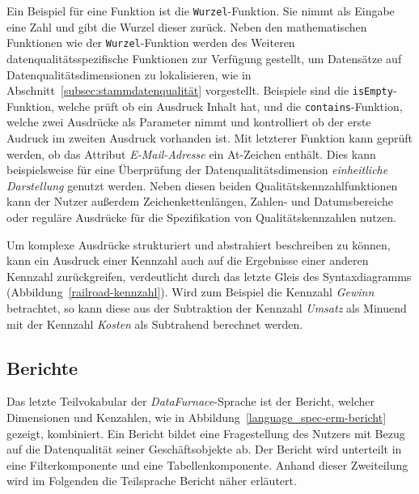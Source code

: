 \documentclass[
  language=german, %
  type=bachelor,%
  ngerman
]{isthesis}
\begin{document}
\begin{content}
	Ein Beispiel für eine Funktion ist die \texttt{Wurzel}-Funktion.  Sie nimmt
	als Eingabe eine Zahl und gibt die Wurzel dieser zurück. Neben den
	mathematischen Funktionen wie der \texttt{Wurzel}-Funktion werden des
	Weiteren datenqualitätsspezifische Funktionen zur Verfügung gestellt, um
	Datensätze auf Datenqualitätsdimensionen zu lokalisieren, wie in
	Abschnitt~\ref{subsec:stammdatenqualität} vorgestellt.  Beispiele sind die
	\texttt{isEmpty}-Funktion, welche prüft ob ein Ausdruck Inhalt hat, und die
	\texttt{contains}-Funktion, welche zwei Ausdrücke als Parameter nimmt und
	kontrolliert ob der erste Audruck im zweiten Ausdruck vorhanden ist. Mit
	letzterer Funktion kann \zB{} geprüft werden, ob das Attribut
	\textit{E-Mail-Adresse} ein At-Zeichen enthält. Dies kann beispielsweise für
	eine Überprüfung der Datenqualitätsdimension \textit{einheitliche
	Darstellung} genutzt werden. Neben diesen beiden Qualitätskennzahlfunktionen
	kann der Nutzer außerdem Zeichenkettenlängen, Zahlen- und Datumsbereiche oder
	reguläre Ausdrücke für die Spezifikation von Qualitätskennzahlen nutzen.



  Um komplexe Ausdrücke strukturiert und abstrahiert beschreiben zu können,
  kann ein Ausdruck einer Kennzahl auch auf die Ergebnisse einer anderen
  Kennzahl zurückgreifen, verdeutlicht durch das letzte Gleis des
  Syntaxdiagramms (Abbildung~\ref{railroad-kennzahl}). Wird zum Beispiel die
  Kennzahl \textit{Gewinn} betrachtet, so kann diese aus der Subtraktion der
  Kennzahl \textit{Umsatz} als Minuend mit der Kennzahl \textit{Kosten} als
  Subtrahend berechnet werden.


  \subsection{Berichte}

  Das letzte Teilvokabular der \textit{DataFurnace}-Sprache ist der Bericht,
  welcher Dimensionen und Kenzahlen, wie in
  Abbildung~\ref{language_spec-erm-bericht} gezeigt, kombiniert. Ein Bericht
  bildet eine Fragestellung des Nutzers mit Bezug auf die Datenqualität seiner
  Geschäftsobjekte ab. Der Bericht wird unterteilt in eine Filterkomponente und
  eine Tabellenkomponente. Anhand dieser Zweiteilung wird im Folgenden die
  Teilsprache Bericht näher erläutert.


\end{content}
\end{document}
